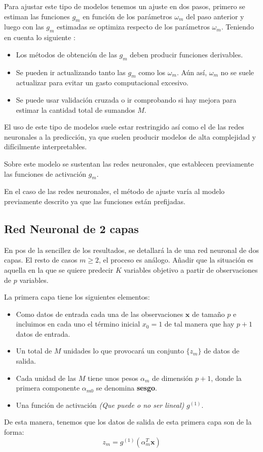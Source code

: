 \noindent Para ajustar este tipo de modelos tenemos un ajuste en dos pasos, primero se estiman las funciones $g_m$ en función de los parámetros $\omega_m$ del paso anterior y luego con las $g_m$ estimadas se optimiza respecto de los parámetros $\omega_m$. Teniendo en cuenta lo siguiente :
\begin{itemize}
\item Los métodos de obtención de las $g_m$ deben producir funciones derivables. 
\item Se pueden ir actualizando tanto las $g_m$ como los $\omega_m$. Aún así, $\omega_m$ no se suele actualizar para evitar un gasto computacional excesivo. 
\item Se puede usar validación cruzada o ir comprobando si hay mejora para estimar la cantidad total de sumandos $M$.
\end{itemize}



\noindent El uso de este tipo de modelos suele estar restringido así como el de las redes neuronales a la predicción, ya que suelen producir modelos de alta complejidad y difícilmente interpretables. 

\noindent Sobre este modelo se sustentan las redes neuronales, que establecen previamente las funciones de activación $g_m$.

\noindent En el caso de las redes neuronales, el método de ajuste varía al modelo previamente descrito ya que las funciones están prefijadas. 


\subsection{Red Neuronal de 2 capas }

\noindent En pos de la sencillez de los resultados, se detallará la  de una red neuronal de dos capas. El resto de casos $m\geq 2$, el proceso es análogo. Añadir que la situación es aquella en la que se quiere predecir $K$ variables objetivo a partir de observaciones de $p$ variables. 

\noindent La primera capa tiene los siguientes elementos:
\begin{itemize}
\item Como datos de entrada cada una de las observaciones $\textbf{x}$ de tamaño $p$ e incluimos en cada uno el término inicial $x_{0}=1$ de tal manera que hay $p+1$ datos de entrada.
\item Un total de $M$ unidades lo que provocará un conjunto $\lbrace z_m \rbrace$ de datos de salida.
\item Cada unidad de las $M$ tiene unos pesos $\alpha_m$ de dimensión $p+1$, donde la primera componente $\alpha_{m0}$ se denomina \textbf{sesgo}.
\item Una función de activación \textit{(Que puede o no ser lineal)} $g^{(1)}$.
\end{itemize}
\noindent De esta manera, tenemos que los datos de salida de esta primera capa son de la forma:
\begin{equation}
z_m=g^{(1)}(\alpha_m^T\textbf{x})
\end{equation}


